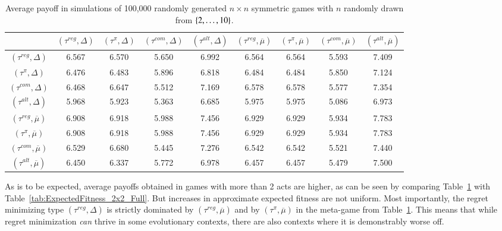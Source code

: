 \documentclass[fleqn,reqno,11pt]{article}
\begin{document}
\begin{table}[]
\centering
\footnotesize
\begin{tabular}{ccccccccc}
  \toprule
 & $(\tau^{reg}, \Delta)$ 
 & $(\tau^{\pi}, \Delta)$ 
 & $(\tau^{com}, \Delta)$
 & $(\tau^{alt}, \Delta)$
 & $(\tau^{reg}, \overline{\mu})$ 
 & $(\tau^{\pi}, \overline{\mu})$ 
 & $(\tau^{com}, \overline{\mu})$
 & $(\tau^{alt}, \overline{\mu})$ \\ 
  \midrule
  $(\tau^{reg}, \Delta)$ & 6.567 & 6.570 & 5.650 & 6.992 & 6.564 & 6.564 & 5.593 & 7.409 \\
  $(\tau^{\pi}, \Delta)$ & 6.476 & 6.483 & 5.896 & 6.818 & 6.484 & 6.484 & 5.850 & 7.124 \\
  $(\tau^{com}, \Delta)$ & 6.468 & 6.647 & 5.512 & 7.169 & 6.578 & 6.578 & 5.577 & 7.354 \\
  $(\tau^{alt}, \Delta)$ & 5.968 & 5.923 & 5.363 & 6.685 & 5.975 & 5.975 & 5.086 & 6.973 \\
  $(\tau^{reg}, \overline{\mu})$ & 6.908 & 6.918 & 5.988 & 7.456 & 6.929 & 6.929 & 5.934 & 7.783 \\
  $(\tau^{\pi}, \overline{\mu})$ & 6.908 & 6.918 & 5.988 & 7.456 & 6.929 & 6.929 & 5.934 & 7.783 \\
  $(\tau^{com}, \overline{\mu})$ & 6.529 & 6.680 & 5.445 & 7.276 & 6.542 & 6.542 & 5.521 & 7.440 \\
  $(\tau^{alt}, \overline{\mu})$ & 6.450 & 6.337 & 5.772 & 6.978 & 6.457 & 6.457 & 5.479 & 7.500 \\
   \bottomrule                         
\end{tabular}                      
\caption{Average payoff in simulations of 100,000
  randomly generated $n \times n$ symmetric games with $n$ randomly drawn from $\left\{2, \dots, 10\right\}$.}
\label{tab:ExpectedFitness_10x10}        
\end{table}

As is to be expected, average payoffs obtained in games with more than 2 acts are higher, as
can be seen by comparing Table~\ref{tab:ExpectedFitness_10x10} with
Table~\ref{tab:ExpectedFitness_2x2_Full}. But increases in approximate expected fitness are not
uniform. Most importantly, the regret minimizing type $(\tau^{reg}, \Delta)$ is
strictly dominated by $(\tau^{reg}, \overline{\mu})$ and by $(\tau^{\pi}, \overline{\mu})$ in
the meta-game from Table~\ref{tab:ExpectedFitness_10x10}. This means that while regret
minimization \emph{can} thrive in some evolutionary contexts, there are also contexts where it
is demonstrably worse off.
\end{document}
